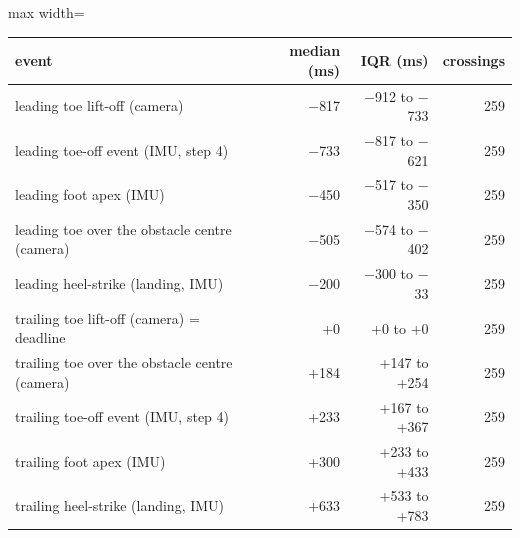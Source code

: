 \begin{adjustbox}{max width=\textwidth}
{\footnotesize
\begin{tabular}{p{7.4cm}rrr}
\toprule
\textbf{event} & \textbf{median (ms)} & \textbf{IQR (ms)} & \textbf{crossings} \\
\midrule
leading toe lift-off (camera) & $-$817 & $-$912 to $-$733 & 259 \\
leading toe-off event (IMU, step 4) & $-$733 & $-$817 to $-$621 & 259 \\
leading foot apex (IMU) & $-$450 & $-$517 to $-$350 & 259 \\
leading toe over the obstacle centre (camera) & $-$505 & $-$574 to $-$402 & 259 \\
leading heel-strike (landing, IMU) & $-$200 & $-$300 to $-$33 & 259 \\
trailing toe lift-off (camera) = deadline & +0 & +0 to +0 & 259 \\
trailing toe over the obstacle centre (camera) & +184 & +147 to +254 & 259 \\
trailing toe-off event (IMU, step 4) & +233 & +167 to +367 & 259 \\
trailing foot apex (IMU) & +300 & +233 to +433 & 259 \\
trailing heel-strike (landing, IMU) & +633 & +533 to +783 & 259 \\
\bottomrule
\end{tabular}
}
\end{adjustbox}
